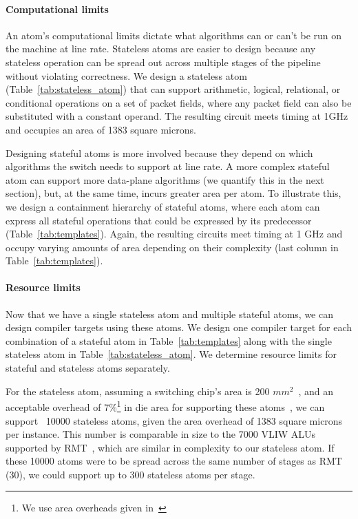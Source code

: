 \paragraph{Computational limits}
An atom's computational limits dictate what algorithms can or can't be run on
the \absmachine machine at line rate. Stateless atoms are easier to design
because any stateless operation can be spread out across multiple stages of the
pipeline without violating correctness. We design a stateless atom
(Table~\ref{tab:stateless_atom}) that can support arithmetic, logical,
relational, or conditional operations on a set of packet fields, where any
packet field can also be substituted with a constant operand. The resulting
circuit meets timing at 1GHz and occupies an area of 1383 square microns.

Designing stateful atoms is more involved because they depend on which
algorithms the switch needs to support at line rate. A more complex stateful
atom can support more data-plane algorithms (we quantify this in the next
section), but, at the same time, incurs greater area per atom. To illustrate
this, we design a containment hierarchy of stateful atoms, where each atom can
express all stateful operations that could be expressed by its predecessor
(Table~\ref{tab:templates}). Again, the resulting circuits meet timing at 1 GHz
and occupy varying amounts of area depending on their complexity (last column
in Table~\ref{tab:templates}).

\paragraph{Resource limits}
Now that we have a single stateless atom and multiple stateful atoms, we can
design compiler targets using these atoms.  We design one compiler target for
each combination of a stateful atom in Table~\ref{tab:templates} along with the
single stateless atom in Table~\ref{tab:stateless_atom}. We determine resource
limits for stateful and stateless atoms separately.

For the stateless atom, assuming a switching chip's area is 200
$mm^2$~\cite{gibb_parsing}, and an acceptable overhead of 7\%\footnote{We use
area overheads given in~\cite{rmt}} in die area for supporting these
atoms~\cite{rmt}, we can support ~10000 stateless atoms, given the area
overhead of 1383 square microns per instance.  This number is comparable in
size to the 7000 VLIW ALUs supported by RMT~\cite{rmt}, which are similar in
complexity to our stateless atom. If these 10000 atoms were to be spread across
the same number of stages as RMT (30), we could support up to 300 stateless atoms
per stage.

